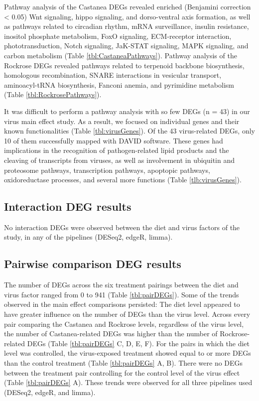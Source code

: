 \documentclass[11pt,a4paper,oldfontcommands,openany]{memoir}
\numberwithin{equation}{section} %
\begin{document}
Pathway analysis of the Castanea DEGs revealed enriched (Benjamini correction < 0.05) Wnt signaling, hippo signaling, and dorso-ventral axis formation, as well as pathways related to circadian rhythm, mRNA surveillance, insulin resistance, inositol phosphate metabolism, FoxO signaling, ECM-receptor interaction, phototransduction, Notch signaling, JaK-STAT signaling, MAPK signaling, and carbon metabolism (Table \ref{tbl:CastaneaPathways}). Pathway analysis of the Rockrose DEGs revealed pathways related to terpenoid backbone biosynthesis, homologous recombination, SNARE interactions in vesicular transport, aminoacyl-tRNA biosynthesis, Fanconi anemia, and pyrimidine metabolism (Table \ref{tbl:RockrosePathways}).

It was difficult to perform a pathway analysis with so few DEGs (n = 43) in our virus main effect study. As a result, we focused on individual genes and their known functionalities (Table \ref{tbl:virusGenes}). Of the 43 virus-related DEGs, only 10 of them successfully mapped with DAVID software. These genes had implications in the recognition of pathogen-related lipid products and the cleaving of transcripts from viruses, as well as involvement in ubiquitin and proteosome pathways, transcription pathways, apoptopic pathways, oxidoreductase processes, and several more functions (Table \ref{tlb:virusGenes}).

\subsection{Interaction DEG results}

No interaction DEGs were observed between the diet and virus factors of the study, in any of the pipelines (DESeq2, edgeR, limma).

\subsection{Pairwise comparison DEG results}

The number of DEGs across the six treatment pairings between the diet and virus factor ranged from 0 to 941 (Table \ref{tbl:pairDEGs}). Some of the trends observed in the main effect comparisons persisted: The diet level appeared to have greater influence on the number of DEGs than the virus level. Across every pair comparing the Castanea and Rockrose levels, regardless of the virus level, the number of Castanea-related DEGs was higher than the number of Rockrose-related DEGs (Table \ref{tbl:pairDEGs} C, D, E, F). For the pairs in which the diet level was controlled, the virus-exposed treatment showed equal to or more DEGs than the control treatment (Table \ref{tbl:pairDEGs} A, B). There were no DEGs between the treatment pair controlling for the control level of the virus effect (Table \ref{tbl:pairDEGs} A). These trends were observed for all three pipelines used (DESeq2, edgeR, and limma). 
\end{document}
